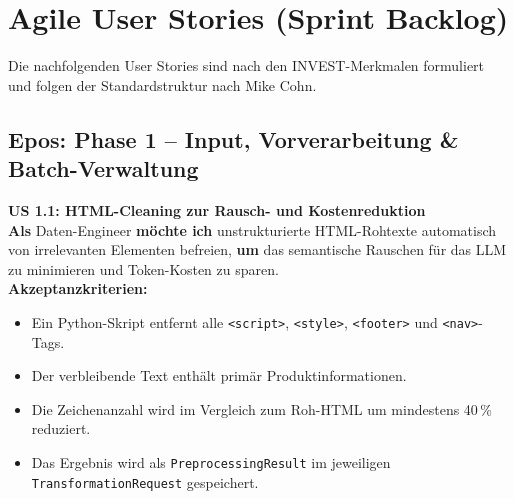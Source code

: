\documentclass[11pt,a4paper]{article}
\begin{document}
\newpage
\section{Agile User Stories (Sprint Backlog)}

Die nachfolgenden User Stories sind nach den INVEST-Merkmalen formuliert und folgen der Standardstruktur nach Mike Cohn.

\subsection{Epos: Phase 1 – Input, Vorverarbeitung \& Batch-Verwaltung}

\noindent\colorbox{usgray}{%
\begin{minipage}{\dimexpr\textwidth-2\fboxsep\relax}
\textbf{\textcolor{usblue}{US 1.1: HTML-Cleaning zur Rausch- und Kostenreduktion}} \\[0.5em]
\textbf{Als} Daten-Engineer \textbf{möchte ich} unstrukturierte HTML-Rohtexte automatisch von irrelevanten Elementen befreien, \textbf{um} das semantische Rauschen für das LLM zu minimieren und Token-Kosten zu sparen.\\[0.5em]
\textbf{Akzeptanzkriterien:}
\begin{itemize}[leftmargin=*, parsep=0pt, topsep=0pt, itemsep=2pt]
    \item Ein Python-Skript entfernt alle \texttt{<script>}, \texttt{<style>}, \texttt{<footer>} und \texttt{<nav>}-Tags.
    \item Der verbleibende Text enthält primär Produktinformationen.
    \item Die Zeichenanzahl wird im Vergleich zum Roh-HTML um mindestens 40\,\% reduziert.
    \item Das Ergebnis wird als \texttt{PreprocessingResult} im jeweiligen \texttt{TransformationRequest} gespeichert.
\end{itemize}
\end{minipage}}
\vspace{1em}
\end{document}
